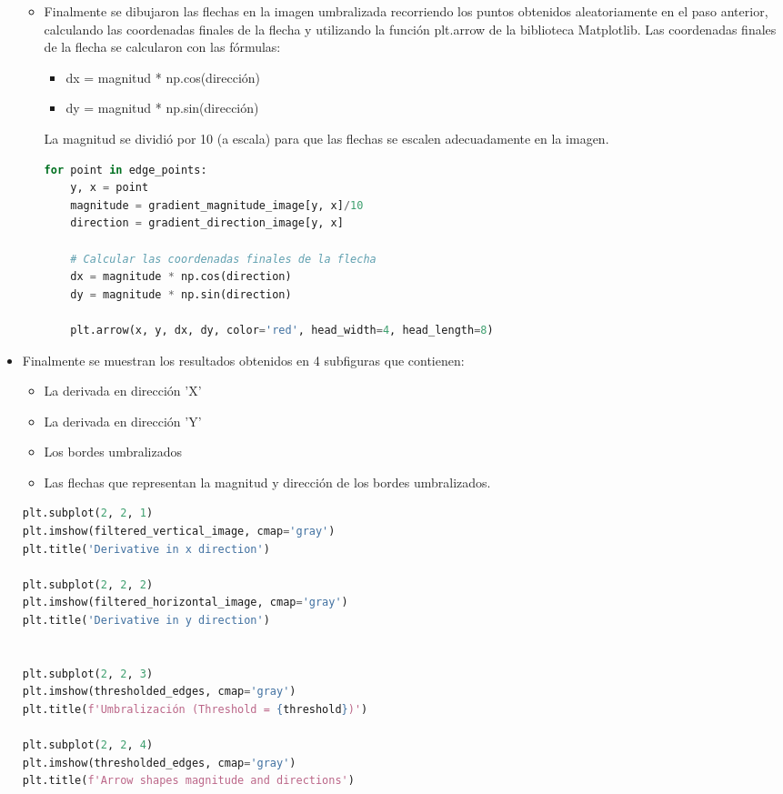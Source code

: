 \documentclass{article}
\begin{document}
\begin{itemize}
\begin{itemize}
            \item Finalmente se dibujaron las flechas en la imagen umbralizada recorriendo los puntos obtenidos aleatoriamente en el paso anterior,
            calculando las coordenadas finales de la flecha y utilizando la función plt.arrow de la biblioteca Matplotlib.
            Las coordenadas finales de la flecha se calcularon con las fórmulas:
            \begin{itemize}
                \item dx = magnitud * np.cos(dirección)
                \item dy = magnitud * np.sin(dirección)
            \end{itemize}
            La magnitud se dividió por 10 (a escala) para que las flechas se escalen adecuadamente en la imagen.
            \begin{lstlisting}[language=Python, caption={Implementación edgeDetector - Dibujar flechas},label={lst:edgeDetector6}]
  for point in edge_points:
    y, x = point
    magnitude = gradient_magnitude_image[y, x]/10
    direction = gradient_direction_image[y, x]

    # Calcular las coordenadas finales de la flecha
    dx = magnitude * np.cos(direction)
    dy = magnitude * np.sin(direction)

    plt.arrow(x, y, dx, dy, color='red', head_width=4, head_length=8)
            \end{lstlisting}
        
        \end{itemize}
        \item Finalmente se muestran los resultados obtenidos en 4 subfiguras que contienen:
        \begin{itemize}
            \item La derivada en dirección 'X'
            \item La derivada en dirección 'Y'
            \item Los bordes umbralizados
            \item Las flechas que representan la magnitud y dirección de los bordes umbralizados.
        \end{itemize}
        \begin{lstlisting}[language=Python, caption={Implementación edgeDetector - Mostrar resultados},label={lst:edgeDetector7}]
plt.subplot(2, 2, 1)
plt.imshow(filtered_vertical_image, cmap='gray')
plt.title('Derivative in x direction')

plt.subplot(2, 2, 2)
plt.imshow(filtered_horizontal_image, cmap='gray')
plt.title('Derivative in y direction')


plt.subplot(2, 2, 3)
plt.imshow(thresholded_edges, cmap='gray')
plt.title(f'Umbralización (Threshold = {threshold})')

plt.subplot(2, 2, 4)
plt.imshow(thresholded_edges, cmap='gray')
plt.title(f'Arrow shapes magnitude and directions')
        
        \end{lstlisting}
    \end{itemize}
    
\end{document}

